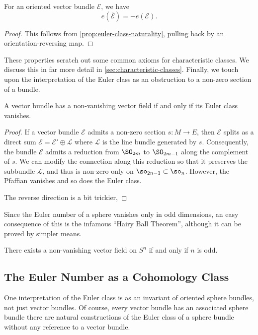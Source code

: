 \begin{proposition}
  For an oriented vector bundle $\mathcal{E}$, we have
  \[
    e(\overline{\mathcal{E}}) = -e(\mathcal{E}).
  \]
\end{proposition}
\begin{proof}
  This follows from \cref{prop:euler-class-naturality}, pulling back by an orientation-reversing map.
\end{proof}

These properties scratch out some common axioms for characteristic classes. We discuss this in far more detail in \cref{sec:characteristic-classes}. 
Finally, we touch upon the interpretation of the Euler class as an obstruction to a non-zero section of a bundle. 

\begin{proposition}
  A vector bundle has a non-vanishing vector field if and only if its Euler class vanishes.
\end{proposition}
\begin{proof}
If a vector bundle $\mathcal{E}$ admits a non-zero section $s : M \to E$, then $\mathcal{E}$ splits as a direct sum $\mathcal{E}=\mathcal{E}'\oplus \mathcal{L}$ where $\mathcal{L}$ is the line bundle generated by $s$. Consequently, the bundle $\mathcal{E}$ admits a reduction from $\SO_{2m}$ to $\SO_{2m-1}$ along the complement of $s$. We can modify the connection along this reduction so that it preserves the subbundle $\mathcal{L}$, and thus is non-zero only on $\so_{2n-1}\subset \so_n$. However, the Pfaffian vanishes and so does the Euler class.

The reverse direction is a bit trickier, 
\end{proof}


Since the Euler number of a sphere vanishes only in odd dimensions, an easy consequence of this is the infamous ``Hairy Ball Theorem'', although it can be proved by simpler means. 

\begin{theorem}
  There exists a non-vanishing vector field on $S^n$ if and only if $n$ is odd.
\end{theorem}

\subsection{The Euler Number as a Cohomology Class}\label{sec:euler-number-cohomology}

One interpretation of the Euler class is as an invariant of oriented sphere bundles, not just vector bundles. Of course, every vector bundle has an associated sphere bundle there are natural constructions of the Euler class of a sphere bundle without any reference to a vector bundle. 

